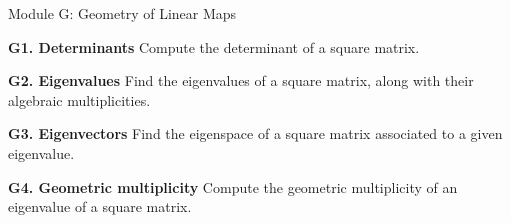 
\begin{module}{Module G: Geometry of Linear Maps}

\begin{moduleStandards}
  \item \textbf{G1. Determinants}
        Compute the determinant of a square matrix.
  \item \textbf{G2. Eigenvalues}
        Find the eigenvalues of a square matrix, along with their algebraic multiplicities.
  \item \textbf{G3. Eigenvectors}
        Find the eigenspace of a square matrix associated to a given eigenvalue.
   \item \textbf{G4. Geometric multiplicity}
        Compute the geometric multiplicity of an eigenvalue of a square matrix.
\end{moduleStandards}







\end{module}
